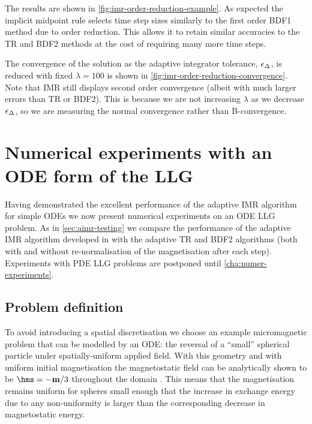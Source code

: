 The results are shown in \cref{fig:imr-order-reduction-example}.
As expected the implicit midpoint rule selects time step sizes similarly to the first order BDF1 method due to order reduction.
This allows it to retain similar accuracies to the TR and BDF2 methods at the cost of requiring many more time steps.

The convergence of the solution as the adaptive integrator tolerance, $\epsilon_{\Delta_{}}$, is reduced with fixed $\lambda = 100$ is shown in \cref{fig:imr-order-reduction-convergence}.
Note that IMR still displays second order convergence (albeit with much larger errors than TR or BDF2).
This is because we are not increasing $\lambda$ as we decrease $\epsilon_{\Delta_{}}$, so we are measuring the normal convergence rather than B-convergence.

\FloatBarrier %

\section{Numerical experiments with an ODE form of the LLG}
\label{sec:imr-ode-llg-numer-exper}


Having demonstrated the excellent performance of the adaptive IMR algorithm for simple ODEs we now present numerical experiments on an ODE LLG problem.
As in \cref{sec:aimr-testing} we compare the performance of the adaptive IMR algorithm developed in  with the adaptive TR and BDF2 algorithms (both with and without re-normalisation of the magnetisation after each step).
Experiments with PDE LLG problems are postponed until \cref{cha:numer-experiments}.

\subsection{Problem definition}
\label{sec:aimr-llg-problem-definition}

To avoid introducing a spatial discretisation we choose an example micromagnetic problem that can be modelled by an ODE: the reversal of a ``small'' spherical particle under spatially-uniform applied field.
With this geometry and with uniform initial magnetisation the magnetostatic field can be analytically shown to be $\hms = -\mv/3$ throughout the domain \cite[112]{Aharoni1996}.
This means that the magnetisation remains uniform for spheres small enough that the increase in exchange energy due to any non-uniformity is larger than the corresponding decrease in magnetostatic energy.

